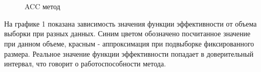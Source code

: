 \documentclass[12pt,twoside]{article}
\begin{document}
\begin{figure}[h!t]\center
{}
\\
\\

\caption{ACC метод}
\label{fig1}
\end{figure}

На графике 1 показана зависимость значения функции эффективности от объема выборки при разных данных. Синим цветом обозначено посчитанное значение при данном объеме, красным - аппроксимация при подвыборке фиксированного размера. Реальное значение функции эффективности попадает в доверительный интервал, что говорит о работоспособности метода.
\end{document}
